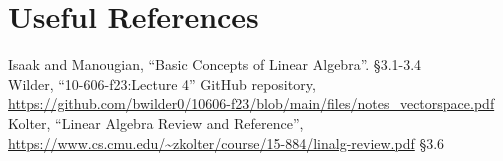\section*{Useful References}
Isaak and Manougian, ``Basic Concepts of Linear Algebra''. \S 3.1-3.4\\
Wilder, ``10-606-f23:Lecture 4'' GitHub repository, \url{https://github.com/bwilder0/10606-f23/blob/main/files/notes_vectorspace.pdf}\\
Kolter, ``Linear Algebra Review and Reference'', \url{https://www.cs.cmu.edu/~zkolter/course/15-884/linalg-review.pdf} \S3.6



